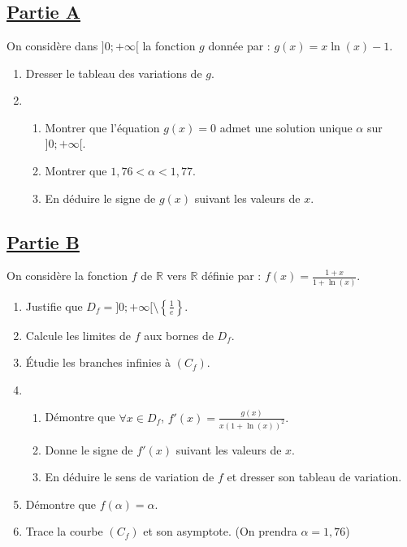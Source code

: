     \section*{}

    \subsection*{\underline{\textbf{Partie A}}}

    On considère dans \( ]0; +\infty[ \) la fonction \( g \) donnée par :  \( g(x) = x \ln(x) - 1. \)

    \begin{enumerate}
        \item Dresser le tableau des variations de \( g \).
        \item
              \begin{enumerate}
                  \item Montrer que l’équation \( g(x) = 0 \) admet une solution unique \( \alpha \) sur \( ]0; +\infty[ \).
                  \item Montrer que \( 1,76 < \alpha < 1,77 \).
                  \item En déduire le signe de \( g(x) \) suivant les valeurs de \( x \).
              \end{enumerate}
    \end{enumerate}

    \subsection*{\underline{\textbf{Partie B}}}

    On considère la fonction \( f \) de \( \mathbb{R} \) vers \( \mathbb{R} \) définie par :
    \( f(x) = \frac{1 + x}{1 + \ln(x)}. \)

    \begin{enumerate}
        \item Justifie que \( D_f = ]0; +\infty[ \setminus \left\{ \frac{1}{e} \right\} \).
        \item Calcule les limites de \( f \) aux bornes de \( D_f \).
        \item Étudie les branches infinies à \( (C_f) \).
        \item
              \begin{enumerate}
                  \item Démontre que \( \forall x \in D_f \), \(  f'(x) = \frac{g(x)}{x (1 + \ln(x))^2}. \)
                  \item Donne le signe de \( f'(x) \) suivant les valeurs de \( x \).
                  \item En déduire le sens de variation de \( f \) et dresser son tableau de variation.
              \end{enumerate}
        \item Démontre que \( f(\alpha) = \alpha \).
        \item Trace la courbe \( (C_f) \) et son asymptote. (On prendra \( \alpha = 1,76 \))
    \end{enumerate}

